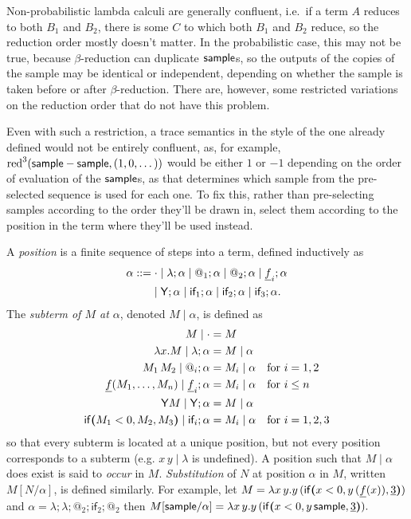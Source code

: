 Non-probabilistic lambda calculi are generally confluent, i.e.~if a term $A$ reduces to both $B_1$ and $B_2$, there is some $C$ 
to which both $B_1$ and $B_2$ reduce,
so the reduction order mostly doesn't matter. 
In the probabilistic case, this may not be true, because $\beta$-reduction can duplicate $\mathsf{sample}$s, so the outputs of the copies of the sample may be identical or independent, depending on whether the sample is taken before or after $\beta$-reduction. 
There are, however, some restricted variations on the reduction order that do not have this problem.

\medskip
Even with such a restriction, a trace semantics in the style of the one already defined would not be entirely confluent, as, for example, $\operatorname{red}^3(\mathsf{sample} - \mathsf{sample}, (1,0,\dots))$ would be either $1$ or $-1$ depending on the order of evaluation of the $\mathsf{sample}$s, as that determines which sample from the pre-selected sequence is used for each one. To fix this, rather than pre-selecting samples according to the order they'll be drawn in, select them according to the position in the term where they'll be used instead.

A \emph{position} is a finite sequence of steps into a term, defined inductively as
\begin{align*}
\alpha ::= & \; {\cdot} \mid \lambda ; \alpha \mid @_1 ; \alpha \mid @_2 ; \alpha \mid \underline f_i ; \alpha \\
& {} \mid \mathsf{Y} ; \alpha \mid \textsf{if}_1 ; \alpha \mid \textsf{if}_2 ; \alpha \mid \textsf{if}_3 ; \alpha.
\end{align*}
The \emph{subterm of $M$ at $\alpha$}, denoted $M \mid \alpha$, is defined as
\begin{align*}
M \mid \cdot & = M \\
\lambda x. M \mid \lambda ; \alpha & = M \mid \alpha \\
M_1 \, M_2 \mid @_i ; \alpha & = M_i \mid \alpha \quad \text{for } i = 1,2 \\
\underline f(M_1,\dots,M_n) \mid \underline f_i ; \alpha & = M_i \mid \alpha \quad \text{for }i \leq n \\
\mathsf{Y} M \mid \mathsf{Y} ; \alpha & = M \mid \alpha \\
\mathsf{if}\boldsymbol{(}M_1 < 0, M_2, M_3\boldsymbol{)} \mid \textsf{if}_i ; \alpha & = M_i \mid \alpha \quad \text{for } i = 1,2,3
\end{align*}
so that every subterm is located at a unique position, but not every position corresponds to a subterm (e.g. $x \, y \mid \lambda$ is undefined). 
A position such that $M\mid \alpha$ does exist is said to \emph{occur} in $M$. 
\emph{Substitution} of $N$ at position $\alpha$ in $M$, written $M[N/\alpha]$, is defined similarly.
For example, let 
\(
M = \lambda x \, y. y \, (\mathsf{if}\boldsymbol{(}x < 0, y \, (\underline f (x)), \underline 3\boldsymbol{)})
\)
and
\(
\alpha =\lambda ; \lambda ; @_2 ; \textsf{if}_2 ; @_2
\)
then 
\(
M[\mathsf{sample} / \alpha] = \lambda x \, y. y \, (\mathsf{if}\boldsymbol{(}x < 0, y \, \mathsf{sample}, \underline 3\boldsymbol{)}).
\)

